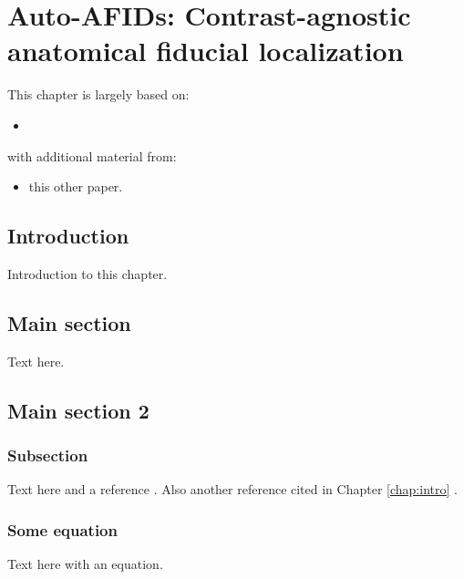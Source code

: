 \chapter{Auto-AFIDs: Contrast-agnostic anatomical fiducial localization}\label{chap:Autoafids}
\newpage
\sloppy
This chapter is largely based on:
\begin{itemize}[noitemsep,topsep=0pt]
	\item \cite{taha2023}
\end{itemize}
with additional material from:
\begin{itemize}[noitemsep,topsep=0pt]
	\item this other paper.
\end{itemize}

\section{Introduction}
Introduction to this chapter.

\section{Main section}

Text here.

\section{Main section 2}
\subsection{Subsection}

Text here and a reference \cite{Author2018}. Also another reference cited in Chapter \ref{chap:intro} \cite{Author1990}.

\subsection{Some equation}

Text here with an equation.

